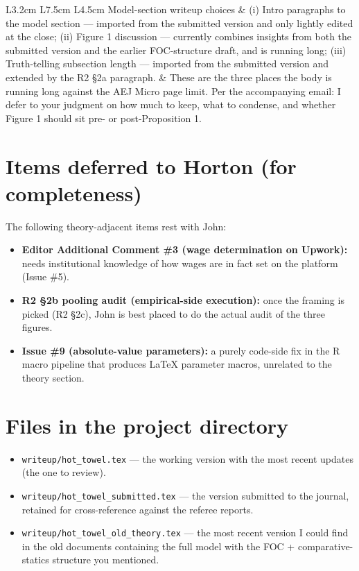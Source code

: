 \documentclass[11pt]{article}
\begin{document}
\begin{longtable}{L{3.2cm} L{7.5cm} L{4.5cm}}
Model-section writeup choices & (i) Intro paragraphs to the model section --- imported from the submitted version and only lightly edited at the close; (ii) Figure 1 discussion --- currently combines insights from both the submitted version and the earlier FOC-structure draft, and is running long; (iii) Truth-telling subsection length --- imported from the submitted version and extended by the R2 \S2a paragraph. & These are the three places the body is running long against the AEJ Micro page limit. Per the accompanying email: I defer to your judgment on how much to keep, what to condense, and whether Figure 1 should sit pre- or post-Proposition 1. \\

\bottomrule
\end{longtable}

\section*{Items deferred to Horton (for completeness)}

The following theory-adjacent items rest with John:
\begin{itemize}[leftmargin=1.4em, topsep=0pt, itemsep=0pt]
    \item \textbf{Editor Additional Comment \#3 (wage determination on Upwork):} needs institutional knowledge of how wages are in fact set on the platform (Issue \#5).
    \item \textbf{R2 \S2b pooling audit (empirical-side execution):} once the framing is picked (R2 \S2c), John is best placed to do the actual audit of the three figures.
    \item \textbf{Issue \#9 (absolute-value parameters):} a purely code-side fix in the R macro pipeline that produces LaTeX parameter macros, unrelated to the theory section.
\end{itemize}

\section*{Files in the project directory}

\begin{itemize}[leftmargin=1.4em, topsep=0pt, itemsep=0pt]
    \item \texttt{writeup/hot\_towel.tex} --- the working version with the most recent updates (the one to review).
    \item \texttt{writeup/hot\_towel\_submitted.tex} --- the version submitted to the journal, retained for cross-reference against the referee reports.
    \item \texttt{writeup/hot\_towel\_old\_theory.tex} --- the most recent version I could find in the old documents containing the full model with the FOC + comparative-statics structure you mentioned.
\end{itemize}
\end{document}
